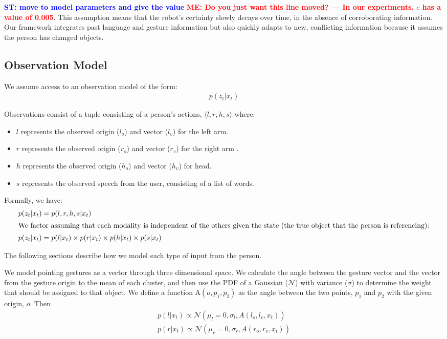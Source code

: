 \documentclass[letterpaper, 10 pt, conference]{ieeeconf}
\newcommand{\stnote}[1]{\textcolor{Blue}{\textbf{ST: #1}}}
\newcommand{\menote}[1]{\textcolor{Red}{\textbf{ME: #1}}}
\begin{document}
\stnote{move to model parameters and give the value}
\menote{Do you just want this line moved? --- In our experiments, $c$ has a value of 0.005}.  This assumption means
that the robot's certainty slowly decays over time, in the absence of
corroborating information.  Our framework integrates past language and
gesture information but also quickly adapts to new, conflicting
information because it assumes the person has changed objects.


\subsection{Observation Model}

We assume access to an observation model of the form:
\begin{align}
p(z_t | x_t)
\end{align}

Observations consist of a tuple consisting of a person's actions,
$\langle l, r, h, s\rangle $ where:
\begin{itemize}
	\item $l$ represents the observed origin ($l_o$) and vector ($l_v$) for the left arm.
	\item $r$ represents the observed origin  ($r_o$) and vector ($r_v$)  for the right arm .
	\item $h$ represents the observed origin  ($h_o$) and vector ($h_v$)  for head.
	\item $s$ represents the observed speech from the user,
          consisting of a list of words.
	\end{itemize}

Formally, we have:
\begin{align}
p(z_t | x_t) &= p(l, r, h, s | x_t)\\
\intertext{We factor assuming that each modality is independent of the others given the state (the true object that the person is referencing):}
p(z_t | x_t) &= p(l | x_t) \times p(r | x_t) \times p(h | x_t) \times p(s | x_t)
\end{align}

\noindent The following sections describe how we model each type of
input from the person.

  We model pointing gestures as a vector
through three dimensional space. We calculate the angle between the
gesture vector and the vector from the gesture origin to the mean of
each cluster, and then use the PDF of a Gaussian ($\mathcal{N}$) with variance ($\sigma$) to determine the weight that should be
assigned to that object. We define a function $\mbox{A}(o, p_1, p_2)$ as the
angle between the two points, $p_1$ and $p_2$ with the given origin,
$o$.  Then 
\begin{align}
p(l | x_t) \propto \mathcal{N}(\mu_l=0, \sigma_l,A(l_o, l_v, x_t))\\
p(r | x_t) \propto \mathcal{N}(\mu_r=0, \sigma_r,A(r_o, r_v, x_t))
\end{align}
\end{document}

